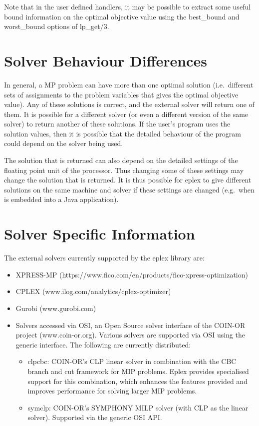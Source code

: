 Note that in the user defined handlers, it may be possible to extract some
useful bound information on the optimal objective value using the
best_bound and worst_bound options of lp_get/3.

\section{Solver Behaviour Differences}
In general, a MP problem can have more than one optimal solution (i.e.\ 
different sets of assignments to the problem variables that gives the
optimal objective value). Any of these solutions is correct, and the
external solver will return one of them. It is possible for a different
solver (or even a different version of the same solver) to return another
of these solutions. If the user's program uses the solution values, then it
is possible that the detailed behaviour of the program could depend on the
solver being used. 

The solution that is returned can also depend on the detailed settings of
the floating point unit of the processor. Thus changing some of these
settings may change the solution that is returned. It is thus possible for
eplex to give different solutions on the same machine and solver if these
settings are changed (e.g.\ when {\eclipse} is embedded into a Java
application). 

\section{Solver Specific Information}
\label{specificsolver}

The external solvers currently supported by the eplex library are:
\begin{itemize}
\item XPRESS-MP (https://www.fico.com/en/products/fico-xpress-optimization)
\item CPLEX (www.ilog.com/analytics/cplex-optimizer)
\item Gurobi (www.gurobi.com)
\item Solvers accessed via OSI, an Open Source solver interface of the
COIN-OR project (www.coin-or.org). Various solvers are supported via OSI
using the generic interface. The following are currently distributed:
\begin{itemize}
\item clpcbc: COIN-OR's CLP linear solver in combination with the CBC
branch and cut framework for MIP problems. Eplex provides specialised
support for this combination, which enhances the features provided and
improves performance for solving larger MIP problems. 
\item symclp: COIN-OR's SYMPHONY MILP solver (with CLP as the linear
solver). Supported via the generic OSI API.
\end{itemize}
\end{itemize}

